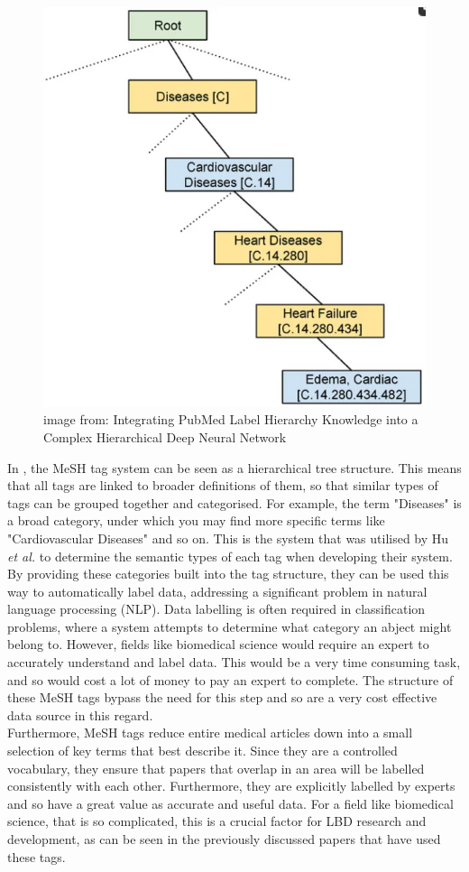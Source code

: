 \documentclass{l4proj}
\begin{document}
\begin{figure}[h]
    \centering
    \includegraphics[width=0.6\linewidth]{images/mesh_label.png}
    \caption{image from: Integrating PubMed Label Hierarchy Knowledge into a Complex Hierarchical Deep Neural Network}
    \label{fig:mesh}
\end{figure}

In , the MeSH tag system can be seen as a hierarchical tree structure. This means that all tags are linked to broader definitions of them, so that similar types of tags can be grouped together and categorised. For example, the term "Diseases" is a broad category, under which you may find more specific terms like "Cardiovascular Diseases" and so on. This is the system that was utilised by Hu \textit{et al.} to determine the semantic types of each tag when developing their system. By providing these categories built into the tag structure, they can be used this way to automatically label data, addressing a significant problem in natural language processing (NLP). Data labelling is often required in classification problems, where a system attempts to determine what category an abject might belong to. However, fields like biomedical science would require an expert to accurately understand and label data. This would be a very time consuming task, and so would cost a lot of money to pay an expert to complete. The structure of these MeSH tags bypass the need for this step and so are a very cost effective data source in this regard.\\

Furthermore, MeSH tags reduce entire medical articles down into a small selection of key terms that best describe it. Since they are a controlled vocabulary, they ensure that papers that overlap in an area will be labelled consistently with each other. Furthermore, they are explicitly labelled by experts and so have a great value as accurate and useful data. For a field like biomedical science, that is so complicated, this is a crucial factor for LBD research and development, as can be seen in the previously discussed papers that  have used these tags. \\
\end{document}
